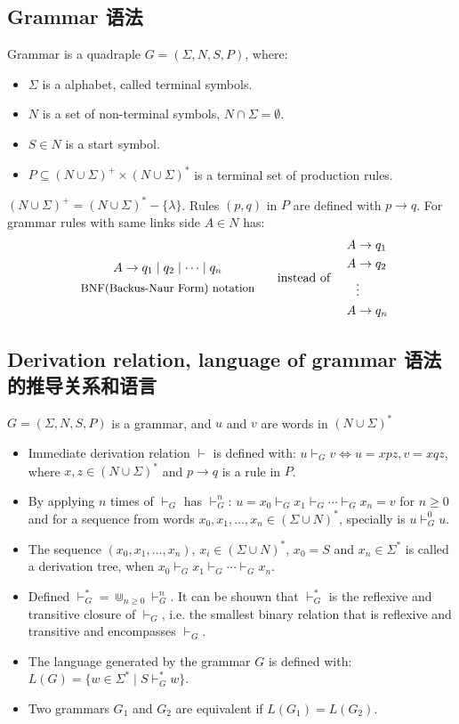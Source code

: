 \documentclass[a4paper,11pt,utf8]{article}
\begin{document}
\subsection{Grammar 语法}
Grammar is a quadraple $G = (\Sigma, N, S, P)$, where: 
\begin{itemize}
    \item $\Sigma$ is a alphabet, called terminal symbols.
    \item $N$ is a set of non-terminal symbols, $N \cap \Sigma = \emptyset$.
    \item $S \in N$ is a start symbol.
    \item $P \subseteq (N \cup \Sigma)^+ \times (N \cup \Sigma)^*$ is a terminal set of production rules.
\end{itemize}
\lineindent $(N \cup \Sigma)^+ = (N \cup \Sigma)^* - \{\lambda\}$.  \newindent
Rules $(p,q)$ in $P$ are defined with $p \to q$. \newindent
For grammar rules with same links side $A \in N$ has:
\[
\begin{array}{c}
A \to q_1 \mid q_2 \mid \cdots \mid q_n \\[1ex]
\text{\small BNF(Backus-Naur Form) notation}
\end{array}
\quad \text{ instead of } \quad
\begin{aligned}
A &\to q_1 \\
A &\to q_2 \\
& \vdots \\
A &\to q_n
\end{aligned}
\]
\subsection{Derivation relation, language of grammar 语法的推导关系和语言}
$G = (\Sigma, N, S, P)$ is a grammar, and $u$ and $v$ are words in $(N \cup \Sigma)^*$
\begin{itemize}
    \item Immediate derivation relation $\vdash$ is defined with: $u \vdash_G v \Longleftrightarrow u=xpz, v=xqz$, where $x,z \in (N \cup \Sigma)^*$ and $p \to q$ is a rule in $P$.
    \item By applying $n$ times of $\vdash_G$ has $\vdash_G^n$: $u = x_0 \vdash_G x_1 \vdash_G \cdots \vdash_G x_n = v$ for $n \geq 0$ and for a sequence from words $x_0, x_1, \dots, x_n \in (\Sigma \cup N)^*$, specially is $u \vdash_G^0 u$.
    \item The sequence $(x_0, x_1, \dots, x_n)$, $x_i \in (\Sigma \cup N)^*$, $x_0 = S$ and $x_n \in \Sigma^*$ is called a derivation tree, when $x_0 \vdash_G x_1 \vdash_G \cdots \vdash_G x_n$.
    \item Defined $\vdash_G^* = \Cup_{n \geq 0} \vdash_G^n$. It can be shouwn that $\vdash_G^*$ is the reflexive and transitive closure of $\vdash_G$, i.e. the smallest binary relation that is reflexive and transitive and encompasses $\vdash_G$.
    \item The language generated by the grammar $G$ is defined with: $L(G) = \{w \in \Sigma^* \mid S \vdash_G^* w\}$.
    \item Two grammars $G_1$ and $G_2$ are equivalent if $L(G_1) = L(G_2)$.
\end{itemize}
\end{document}

